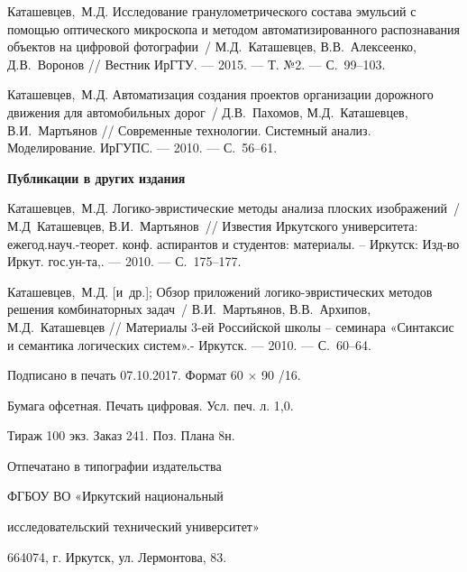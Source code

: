\begin{thebibliography}{10}
 Каташевцев,~М.Д. Исследование гранулометрического
  состава эмульсий с помощью оптического
  микроскопа и методом автоматизированного
  распознавания объектов на цифровой
  фотографии~/ М.Д.~Каташевцев, В.В.~Алексеенко, Д.В.~Воронов // Вестник ИрГТУ.
--- 2015.
--- Т. №2.
--- {С.}~99--103.{}

 Каташевцев,~М.Д. Автоматизация создания проектов
  организации дорожного движения для
  автомобильных дорог~/ Д.В.~Пахомов, М.Д.~Каташевцев, В.И.~Мартьянов // Современные
  технологии. Системный анализ.
  Моделирование. ИрГУПС.
--- 2010.
--- {С.}~56--61.{}

\centerline{\textbf{Публикации в других издания}}

 Каташевцев,~М.Д. Логико-эвристические методы анализа
  плоских изображений~/ М.Д~Каташевцев,
  В.И.~Мартьянов~// Известия Иркутского
  университета: ежегод.науч.-теорет. конф.
  аспирантов и студентов: материалы. –
  Иркутск: Изд-во Иркут. гос.ун-та,.
--- 2010.
--- {С.}~175--177.{}

 Каташевцев,~М.Д.
  {[и~др.]}; Обзор приложений
  логико-эвристических методов решения
  комбинаторных задач~/ В.И.~Мартьянов, В.В.~Архипов, М.Д.~Каташевцев // Материалы 3-ей
  Российской школы – семинара «Синтаксис и
  семантика логических систем».- Иркутск.
--- 2010.
--- {С.}~60--64.{}

\end{thebibliography}


\vfill
{}
\begin{center}
Подписано в печать 07.10.2017. Формат 60 $\times$ 90 /16.

Бумага офсетная. Печать цифровая. Усл. печ. л. 1,0.

Тираж 100 экз. Заказ 241. Поз. Плана 8н.
\bigskip

Отпечатано в типографии издательства

ФГБОУ ВО «Иркутский национальный 

исследовательский технический университет»

664074, г. Иркутск, ул. Лермонтова, 83.
\end{center}